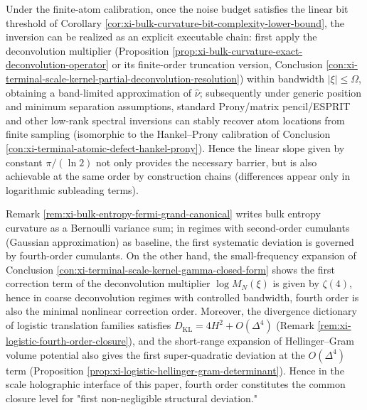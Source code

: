 \begin{remark}\label{rem:xi-bulk-curvature-superresolution-achievability}
Under the finite-atom calibration, once the noise budget satisfies the linear bit threshold of Corollary \ref{cor:xi-bulk-curvature-bit-complexity-lower-bound},
the inversion can be realized as an explicit executable chain: first apply the deconvolution multiplier (Proposition \ref{prop:xi-bulk-curvature-exact-deconvolution-operator} or its finite-order truncation version, Conclusion \ref{con:xi-terminal-scale-kernel-partial-deconvolution-resolution}) within bandwidth \(|\xi|\le \Omega\),
obtaining a band-limited approximation of \(\widehat\nu\);
subsequently under generic position and minimum separation assumptions, standard Prony/matrix pencil/ESPRIT and other low-rank spectral inversions can stably recover atom locations from finite sampling (isomorphic to the Hankel--Prony calibration of Conclusion \ref{con:xi-terminal-atomic-defect-hankel-prony}).
Hence the linear slope given by constant \(\pi/(\ln 2)\) not only provides the necessary barrier, but is also achievable at the same order by construction chains (differences appear only in logarithmic subleading terms).
\end{remark}
\begin{remark}[\texorpdfstring{$(q=4)$}{(q=4)} universal threshold: first visible correction order for fluctuation, deconvolution, and two-body volume]\label{rem:xi-scale-q4-threshold-principle}
Remark \ref{rem:xi-bulk-entropy-fermi-grand-canonical} writes bulk entropy curvature as a Bernoulli variance sum;
in regimes with second-order cumulants (Gaussian approximation) as baseline, the first systematic deviation is governed by fourth-order cumulants.
On the other hand, the small-frequency expansion of Conclusion \ref{con:xi-terminal-scale-kernel-gamma-closed-form} shows the first correction term of the deconvolution multiplier \(\log M_N(\xi)\) is given by \(\zeta(4)\),
hence in coarse deconvolution regimes with controlled bandwidth, fourth order is also the minimal nonlinear correction order.
Moreover, the divergence dictionary of logistic translation families satisfies \(D_{\mathrm{KL}}=4H^2+O(\Delta^4)\) (Remark \ref{rem:xi-logistic-fourth-order-closure}),
and the short-range expansion of Hellinger--Gram volume potential also gives the first super-quadratic deviation at the \(O(\Delta^4)\) term (Proposition \ref{prop:xi-logistic-hellinger-gram-determinant}).
Hence in the scale holographic interface of this paper, fourth order constitutes the common closure level for "first non-negligible structural deviation."
\end{remark}
